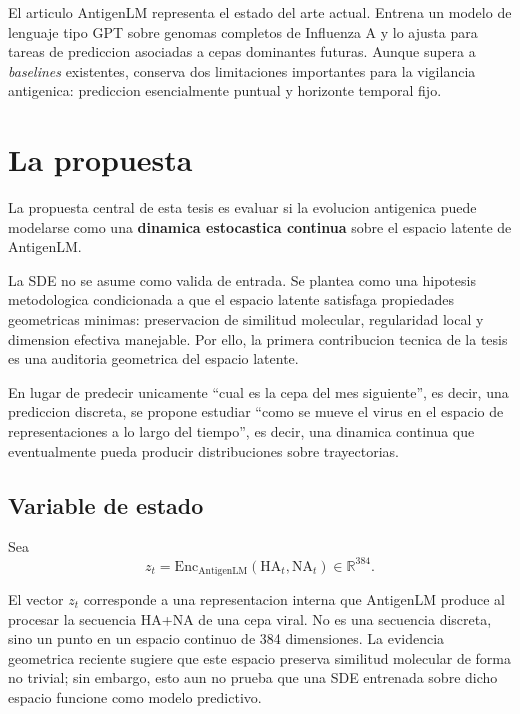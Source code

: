 \documentclass[12pt,letterpaper]{article}
\newcommand{\R}{\mathbb{R}}
\newcommand{\HA}{\mathrm{HA}}
\newcommand{\NA}{\mathrm{NA}}
\newcommand{\Enc}{\mathrm{Enc}}
\newcommand{\AntigenLM}{\mathrm{AntigenLM}}
\begin{document}
El articulo AntigenLM \cite{pei2026antigenlm} representa el estado del arte actual. Entrena un modelo de lenguaje tipo GPT sobre genomas completos de Influenza A y lo ajusta para tareas de prediccion asociadas a cepas dominantes futuras. Aunque supera a \emph{baselines} existentes, conserva dos limitaciones importantes para la vigilancia antigenica: prediccion esencialmente puntual y horizonte temporal fijo.

\section{La propuesta}

La propuesta central de esta tesis es evaluar si la evolucion antigenica puede modelarse como una \textbf{dinamica estocastica continua} sobre el espacio latente de AntigenLM.

La SDE no se asume como valida de entrada. Se plantea como una hipotesis metodologica condicionada a que el espacio latente satisfaga propiedades geometricas minimas: preservacion de similitud molecular, regularidad local y dimension efectiva manejable. Por ello, la primera contribucion tecnica de la tesis es una auditoria geometrica del espacio latente.

En lugar de predecir unicamente ``cual es la cepa del mes siguiente'', es decir, una prediccion discreta, se propone estudiar ``como se mueve el virus en el espacio de representaciones a lo largo del tiempo'', es decir, una dinamica continua que eventualmente pueda producir distribuciones sobre trayectorias.

\subsection{Variable de estado}

Sea
\begin{equation}
    z_t = \Enc_{\AntigenLM}(\HA_t, \NA_t) \in \R^{384}.
\end{equation}

El vector $z_t$ corresponde a una representacion interna que AntigenLM produce al procesar la secuencia HA+NA de una cepa viral. No es una secuencia discreta, sino un punto en un espacio continuo de 384 dimensiones. La evidencia geometrica reciente sugiere que este espacio preserva similitud molecular de forma no trivial; sin embargo, esto aun no prueba que una SDE entrenada sobre dicho espacio funcione como modelo predictivo.
\end{document}
